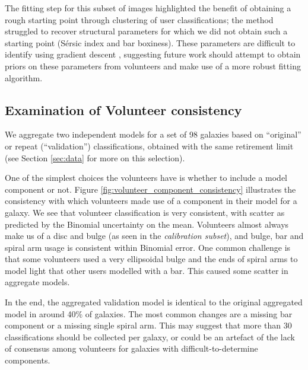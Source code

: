 \documentclass[trackchanges]{aastex63}
\begin{document}
The fitting step for this subset of images highlighted the benefit of obtaining a rough starting point through clustering of user classifications; the method struggled to recover structural parameters for which we did not obtain such a starting point (S\'ersic index and bar boxiness). These parameters are difficult to identify using gradient descent \citep{2012MNRAS.421.2277L}, suggesting future work should attempt to obtain priors on these parameters from volunteers and make use of a more robust fitting algorithm.

\subsection{Examination of Volunteer consistency}
We aggregate two independent models for a set of 98 galaxies based on ``original'' or repeat (``validation'') classifications, obtained with the same retirement limit (see Section \ref{sec:data} for more on this selection).

One of the simplest choices the volunteers have is whether to include a model component or not. Figure \ref{fig:volunteer_component_consistency} illustrates the consistency with which volunteers made use of a component in their model for a galaxy. We see that volunteer classification is very consistent, with scatter as predicted by the Binomial uncertainty on the mean. Volunteers almost always make us of a disc and bulge (as seen in the \textit{calibration subset}), and bulge, bar and spiral arm usage is consistent within Binomial error. One common challenge is that some volunteers used a very ellipsoidal bulge and the ends of spiral arms to model light that other users modelled with a bar. This caused some scatter in aggregate models.

In the end, the aggregated validation model is identical to the original aggregated model in around 40\% of galaxies. The most common changes are a missing bar component or a missing single spiral arm. This may suggest that more than 30 classifications should be collected per galaxy, or could be an artefact of the lack of consensus among volunteers for galaxies with difficult-to-determine components.

\begin{figure*}
  \caption{Comparison of frequency of use of component in volunteer models between the original and validation sets of classifications. Errors shown on the disc, bulge and bar arise from Binomial error estimation. We see that classifications are generally consistent within errors, validating our assumption of volunteer independence.}
  \label{fig:volunteer_component_consistency}
\end{figure*}
\end{document}
